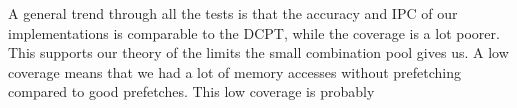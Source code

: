 A general trend through all the tests is that the accuracy and IPC of our implementations is comparable to the DCPT, while the coverage is a lot poorer. This supports our theory of the limits the small combination pool gives us. A low coverage means that we had a lot of memory accesses without prefetching compared to good prefetches. This low coverage is probably 

%
%
%
